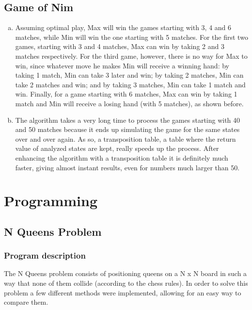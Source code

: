 \documentclass{article}
\begin{document}
\subsection*{Game of Nim}

\begin{enumerate}[a)]
\item Assuming optimal play, Max will win the games starting with 3, 4 and 6 matches, while Min will win the one starting with 5 matches. For the first two games, starting with 3 and 4 matches, Max can win by taking 2 and 3 matches respectively. For the third game, however, there is no way for Max to win, since whatever move he makes Min will receive a winning hand: by taking 1 match, Min can take 3 later and win; by taking 2 matches, Min can take 2 matches and win; and by taking 3 matches, Min can take 1 match and win. Finally, for a game starting with 6 matches, Max can win by taking 1 match and Min will receive a losing hand (with 5 matches), as shown before. 

\addtocounter{enumi}{1}

\item The algorithm takes a very long time to process the games starting with 40 and 50 matches because it ends up simulating the game for the same states over and over again. As so, a transposition table, a table where the return value of analyzed states are kept, really speeds up the process. After enhancing the algorithm with a transposition table it is definitely much faster, giving almost instant results, even for numbers much larger than 50.

\end{enumerate}

\section*{Programming} 
\subsection*{N Queens Problem}
\subsubsection*{Program description}

The N Queens problem consists of positioning queens on a N x N board in such a way that none of them collide (according to the chess rules). In order to solve this problem a few different methods were implemented, allowing for an easy way to compare them. 
\end{document}
